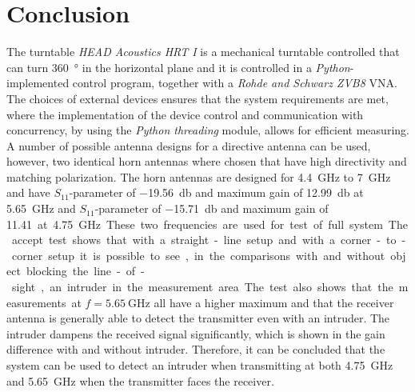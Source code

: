 \chapter{Conclusion}
The turntable \textit{HEAD Acoustics HRT I} is a mechanical turntable controlled that can turn \SI{360}{\degree} in the horizontal plane and it is controlled in a \textit{Python}-implemented control program, together with a \textit{Rohde and Schwarz ZVB8} VNA. The choices of external devices ensures that the system requirements are met, where the implementation of the device control and communication with concurrency, by using the \textit{Python threading} module, allows for efficient measuring. A number of possible antenna designs for a directive antenna can be used, however, two identical horn antennas where chosen that have high directivity and matching polarization. The horn antennas are designed for \SI{4.4}{\giga\hertz} to \SI{7}{\giga\hertz} and have $S_{11}$-parameter of \SI{-19.56}{\decibel} and maximum gain of \SI{12.99}{\decibel} at \SI{5.65}{\giga\hertz} and $S_{11}$-parameter of \SI{-15.71}{\decibel} and maximum gain of \SI{11.41} at \SI{4.75}{\giga\hertz}. These two frequencies are used for test of full system. The accept test shows that with a straight-line setup and with a corner-to-corner setup it is possible to see, in the comparisons with and without object blocking the line-of-sight, an intruder in the measurement area. The test also shows that the measurements at $f=\SI{5.65}{\giga\hertz}$ all have a higher maximum and that the receiver antenna is generally able to detect the transmitter even with an intruder. The intruder dampens the received signal significantly, which is shown in the gain difference with and without intruder. Therefore, it can be concluded that the system can be used to detect an intruder when transmitting at both \SI{4.75}{\giga\hertz} and \SI{5.65}{\giga\hertz} when the transmitter faces the receiver. 